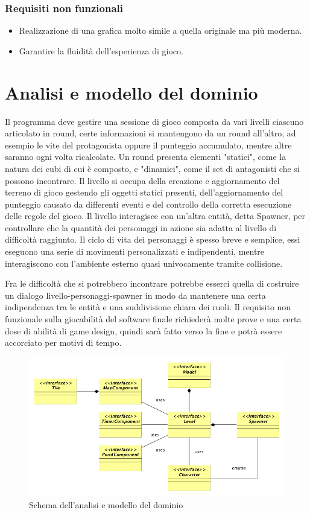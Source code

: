 \documentclass[a4paper,12pt, hidelinks]{report}
\begin{document}
\subsubsection{Requisiti non funzionali}
\begin{itemize}
	\item Realizzazione di una grafica molto simile a quella originale ma più moderna.
	\item Garantire la fluidità dell’esperienza di gioco.

\end{itemize}

\section{Analisi e modello del dominio}

Il programma deve gestire una sessione di gioco composta da vari livelli ciascuno articolato in round, certe informazioni si mantengono da un round all'altro, ad esempio le vite del protagonista oppure il punteggio accumulato, mentre altre saranno ogni volta ricalcolate. Un round presenta elementi "statici", come la natura dei cubi di cui è composto, e "dinamici", come il set di antagonisti che si possono incontrare. Il livello si occupa della creazione e aggiornamento del terreno di gioco gestendo gli oggetti statici presenti, dell'aggiornamento del punteggio causato da differenti eventi e del controllo della corretta esecuzione delle regole del gioco. Il livello interagisce con un'altra entità, detta Spawner, per controllare che la quantità dei personaggi in azione sia adatta al livello di difficoltà raggiunto. Il ciclo di vita dei personaggi è spesso breve e semplice, essi eseguono una serie di movimenti personalizzati e indipendenti, mentre interagiscono con l'ambiente esterno quasi univocamente tramite collisione.

Fra le difficoltà che si potrebbero incontrare potrebbe esserci quella di costruire un dialogo livello-personaggi-spawner in modo da mantenere una certa indipendenza tra le entità e una suddivisione chiara dei ruoli. Il requisito non funzionale sulla giocabilità del software finale richiederà molte prove e una certa dose di abilità di game design, quindi sarà fatto verso la fine e potrà essere accorciato per motivi di tempo.

\begin{figure}[H]
\centering{}
\includegraphics[width=\linewidth]{img/Analisi}
\caption{Schema dell'analisi e modello del dominio}
\label{img:Analysis}
\end{figure}
\end{document}

